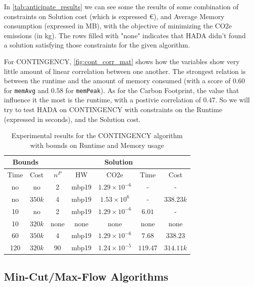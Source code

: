 \documentclass[a4paper,singleside,12pt]{report} %
\begin{document}
In \ref{tab:anticipate_results} we can see some the results of some combination of constraints on Solution cost (which is
expressed €), and Average Memory consumption (expressed in MB), with the objective of minimizing the CO2e 
emissions (in kg). The rows filled with "none" indicates that HADA didn't found a solution satisfying those constraints for the
given algorithm.

For CONTINGENCY, \ref{fig:cont_corr_mat} shows how the variables show very little amount of linear correlation between one another. The strongest relation is between the runtime and the amount of memory consumed
(with a score of $0.60$ for \verb|memAvg| and $0.58$ for \verb|memPeak|). As for the Carbon Footprint, the value that influence it the most is the runtime, with a postivie correlation of $0.47$.
So we will try to test HADA on CONTINGENCY with constraints on the Runtime (expressed in seconds), and the Solution cost.

\begin{table}[h!]
    \centering
    \begin{tabular}{|cc|ccccc|}
        \hline
        \multicolumn{2}{|c|}{Bounds} & \multicolumn{5}{c|}{Solution} \\
        \hline
        Time & Cost & $n^P$ & HW & CO2e & Time & Cost \\
        \hline
        no & no & 2 & mbp19 & $1.29 \times 10^{-6}$ & - & - \\
        no & $350k$ & 4 & mbp19 & $1.53 \times 10^{6}$ & - & $338.23k$ \\
        10 & no & 2 & mbp19 & $1.29 \times 10^{-6}$ & $6.01$ & - \\
        10 & $320k$ & none & none & none & none & none \\
        60 & $350k$ & 4 & mbp19 & $1.29 \times 10^{-6}$ & $7.68$ & $338.23$ \\
        120 & $320k$ & 90 & mbp19 & $1.24 \times 10^{-5}$ & $119.47$ & $314.11k$ \\
        \hline
    \end{tabular}
    \caption{Experimental results for the CONTINGENCY algorithm with bounds on Runtime and Memory usage}
    \label{tab:contingency_results}
\end{table}

\subsection{Min-Cut/Max-Flow Algorithms}
\end{document}
